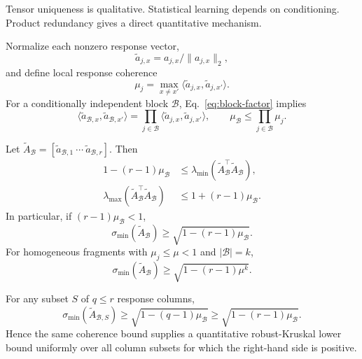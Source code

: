 Tensor uniqueness is qualitative.  Statistical learning depends on conditioning.  Product redundancy gives a direct quantitative mechanism.

Normalize each nonzero response vector,
\begin{equation}
\widetilde a_{j,x}=a_{j,x}/\|a_{j,x}\|_2,
\end{equation}
and define local response coherence
\begin{equation}
\mu_j=\max_{x\neq x'}\langle\widetilde a_{j,x},\widetilde a_{j,x'}\rangle.
\label{eq:response-coherence}
\end{equation}
For a conditionally independent block $\mathcal B$, Eq.~\eqref{eq:block-factor} implies
\begin{equation}
\langle\widetilde a_{\mathcal B,x},\widetilde a_{\mathcal B,x'}\rangle
=\prod_{j\in\mathcal B}\langle\widetilde a_{j,x},\widetilde a_{j,x'}\rangle,
\qquad
\mu_{\mathcal B}\le\prod_{j\in\mathcal B}\mu_j.
\label{eq:coherence-product}
\end{equation}

\begin{theorem}
\label{thm:response-conditioning}
Let $\widetilde A_{\mathcal B}=[\widetilde a_{\mathcal B,1}\ \cdots\ \widetilde a_{\mathcal B,r}]$.  Then
\begin{align}
1-(r-1)\mu_{\mathcal B}
&\le\lambda_{\min}(\widetilde A_{\mathcal B}^\top\widetilde A_{\mathcal B}),\\
\lambda_{\max}(\widetilde A_{\mathcal B}^\top\widetilde A_{\mathcal B})
&\le1+(r-1)\mu_{\mathcal B}.
\end{align}
In particular, if $(r-1)\mu_{\mathcal B}<1$,
\begin{equation}
\sigma_{\min}(\widetilde A_{\mathcal B})
\ge\sqrt{1-(r-1)\mu_{\mathcal B}}.
\label{eq:smin-response}
\end{equation}
For homogeneous fragments with $\mu_j\le\mu<1$ and $|\mathcal B|=k$,
\begin{equation}
\sigma_{\min}(\widetilde A_{\mathcal B})
\ge\sqrt{1-(r-1)\mu^k}.
\label{eq:homog-conditioning}
\end{equation}
\end{theorem}

\begin{corollary}
\label{cor:subset-conditioning}
For any subset $S$ of $q\le r$ response columns,
\begin{equation}
\sigma_{\min}(\widetilde A_{\mathcal B,S})
\ge
\sqrt{1-(q-1)\mu_{\mathcal B}}
\ge
\sqrt{1-(r-1)\mu_{\mathcal B}}.
\end{equation}
Hence the same coherence bound supplies a quantitative robust-Kruskal lower bound uniformly over all column subsets for which the right-hand side is positive.
\end{corollary}

